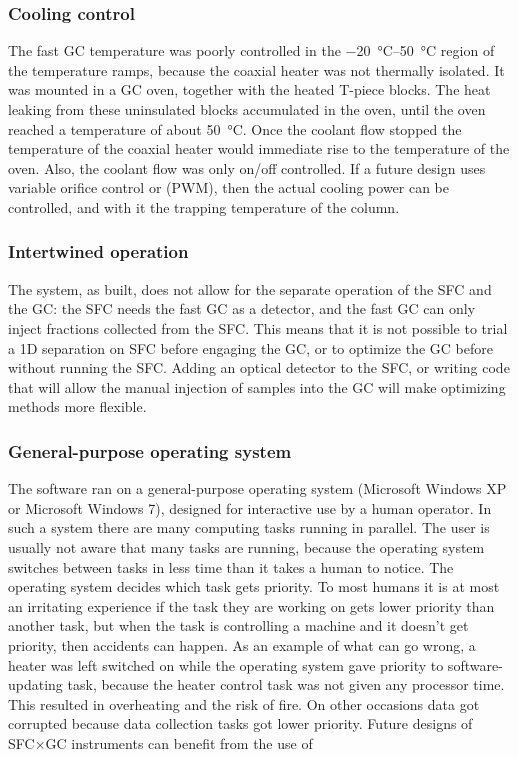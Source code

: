 \subsubsection{Cooling control}

The fast GC temperature was poorly controlled in the \SIrange{-20}{50}{\celsius}
region of the temperature ramps, because the coaxial heater was not thermally
isolated. It was mounted in a GC oven, together with the heated T-piece blocks.
The heat leaking from these uninsulated blocks accumulated in the oven, until
the oven reached a temperature of about \SI{50}{\celsius}. Once the coolant flow
stopped the temperature of the coaxial heater would immediate rise to the
temperature of the oven. Also, the coolant flow was only on/off controlled. If a
future design uses variable orifice control or  (PWM), then the actual cooling power can be controlled, and with it the
trapping temperature of the column.

\subsubsection{Intertwined operation}

The system, as built, does not allow for the separate operation of the SFC and
the GC: the SFC needs the fast GC as a detector, and the fast GC can only inject
fractions collected from the SFC. This means that it is not possible to trial a
1D separation on SFC before engaging the \twoD GC, or to optimize the GC before
without running the SFC. Adding an optical detector to the SFC, or writing code
that will allow the manual injection of samples into the GC will make optimizing
methods more flexible.

\subsubsection{General-purpose operating system}

The software ran on a general-purpose operating system (Microsoft Windows XP or
Microsoft Windows 7), designed for interactive use by a human operator. In such
a system there are many computing tasks running in parallel. The user is usually
not aware that many tasks are running, because the operating system switches
between tasks in less time than it takes a human to notice. The operating system
decides which task gets priority. To most humans it is at most an irritating
experience if the task they are working on gets lower priority than another
task, but when the task is controlling a machine and it doesn't get priority,
then accidents can happen. As an example of what can go wrong, a heater was left
switched on while the operating system gave priority to software-updating task,
because the heater control task was not given any processor time. This resulted
in overheating and the risk of fire. On other occasions data got corrupted
because data collection tasks got lower priority. Future designs of SFC×GC
instruments can benefit from the use of 

